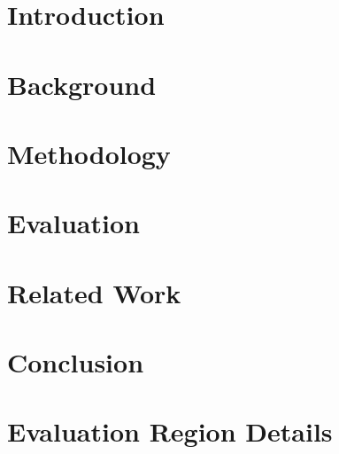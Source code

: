 \documentclass[11pt]{ucthesis}
\begin{document}
\chapter{Introduction}
\label{chap:introduction}


\chapter{Background}
\label{chap:background}


\chapter{Methodology}
\label{chap:methodology}


\chapter{Evaluation}
\label{chap:evaluation}


\chapter{Related Work}
\label{chap:related}
\begin{sloppypar}

\end{sloppypar}

\chapter{Conclusion}
\label{chap:conclusion}


\appendix
\chapter{Evaluation Region Details}
\label{chap:appendix}


\nocite{*}


\end{document}
